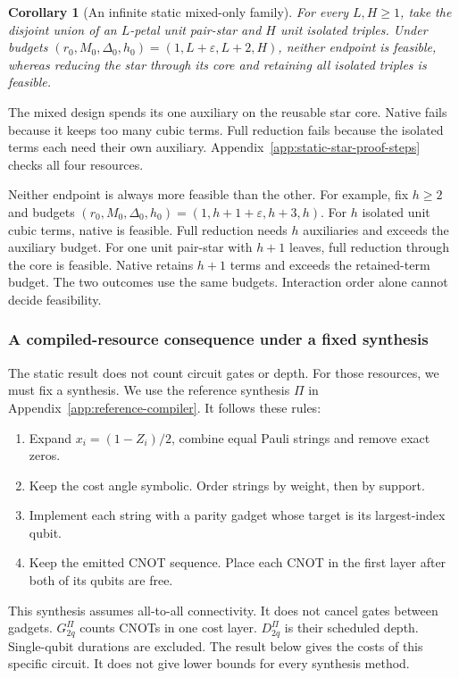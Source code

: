 \documentclass[a4paper,onecolumn,11pt,unpublished]{quantumarticle}
\newtheorem{corollary}[corollary]{Corollary}
\theoremstyle{remark}
\begin{document}
\begin{corollary}[An infinite static mixed-only family]
\label{cor:static-star-isolated}
For every $L,H\geq1$, take the disjoint union of an $L$-petal unit pair-star
and $H$ unit isolated triples. Under budgets
$(r_0,M_0,\Delta_0,h_0)=(1,L+\varepsilon,L+2,H)$,
neither endpoint is feasible, whereas reducing the star through its core
and retaining all isolated triples is feasible.
\end{corollary}
The mixed design spends its one auxiliary on the reusable star core.
Native fails because it keeps too many cubic terms.
Full reduction fails because the isolated terms each need their own auxiliary.
Appendix~\ref{app:static-star-proof-steps} checks all four resources.

Neither endpoint is always more feasible than the other.
For example, fix $h\geq2$ and budgets
$(r_0,M_0,\Delta_0,h_0)=(1,h+1+\varepsilon,h+3,h)$.
For $h$ isolated unit cubic terms, native is feasible. Full reduction needs
$h$ auxiliaries and exceeds the auxiliary budget.
For one unit pair-star with $h+1$ leaves, full reduction through the core
is feasible. Native retains $h+1$ terms and exceeds the retained-term budget.
The two outcomes use the same budgets. Interaction order alone cannot
decide feasibility.

\subsubsection{A compiled-resource consequence under a fixed synthesis}
\label{sec:compiled-phase-corollary}
The static result does not count circuit gates or depth. For those resources,
we must fix a synthesis. We use the reference synthesis $\Pi$ in
Appendix~\ref{app:reference-compiler}. It follows these rules:
\begin{enumerate}
\item Expand $x_i=(1-Z_i)/2$, combine equal Pauli strings and remove exact zeros.
\item Keep the cost angle symbolic. Order strings by weight, then by support.
\item Implement each string with a parity gadget whose target is its
largest-index qubit.
\item Keep the emitted CNOT sequence. Place each CNOT in the first layer
after both of its qubits are free.
\end{enumerate}
This synthesis assumes all-to-all connectivity. It does not cancel gates
between gadgets. $G_{2q}^\Pi$ counts CNOTs in one cost layer.
$D_{2q}^\Pi$ is their scheduled depth. Single-qubit durations are excluded.
The result below gives the costs of this specific circuit. It does not
give lower bounds for every synthesis method.
\end{document}
